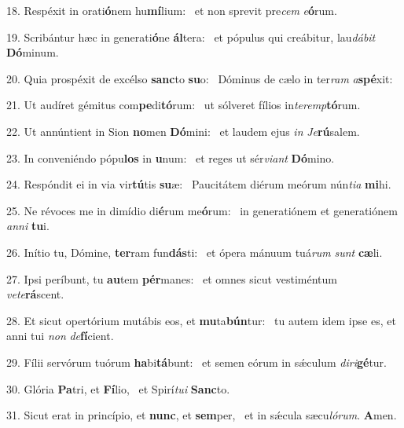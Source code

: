 18. Respéxit in orati\textbf{ó}nem hu\textbf{mí}lium: \ast\  et non sprevit pre\textit{cem} \textit{e}\textbf{ó}rum.\

19. Scribántur hæc in generati\textbf{ó}ne \textbf{ál}tera: \ast\  et pópulus qui creábitur, lau\textit{dá}\textit{bit} \textbf{Dó}minum.\

20. Quia prospéxit de excélso \textbf{sanc}to \textbf{su}o: \ast\  Dóminus de cælo in ter\textit{ram} \textit{a}\textbf{spé}xit:\

21. Ut audíret gémitus com\textbf{pe}di\textbf{tó}rum: \ast\  ut sólveret fílios in\textit{ter}\textit{emp}\textbf{tó}rum.\

22. Ut annúntient in Sion \textbf{no}men \textbf{Dó}mini: \ast\  et laudem ejus \textit{in} \textit{Je}\textbf{rú}salem.\

23. In conveniéndo pópu\textbf{los} in \textbf{u}num: \ast\  et reges ut sér\textit{vi}\textit{ant} \textbf{Dó}mino.\

24. Respóndit ei in via vir\textbf{tú}tis \textbf{su}æ: \ast\  Paucitátem diérum meórum nún\textit{ti}\textit{a} \textbf{mi}hi.\

25. Ne révoces me in dimídio di\textbf{é}rum me\textbf{ó}rum: \ast\  in generatiónem et generatiónem \textit{an}\textit{ni} \textbf{tu}i.\

26. Inítio tu, Dómine, \textbf{ter}ram fun\textbf{dás}ti: \ast\  et ópera mánuum tuá\textit{rum} \textit{sunt} \textbf{cæ}li.\

27. Ipsi períbunt, tu \textbf{au}tem \textbf{pér}manes: \ast\  et omnes sicut vestiméntum \textit{ve}\textit{te}\textbf{rá}scent.\

28. Et sicut opertórium mutábis eos, et \textbf{mu}ta\textbf{bún}tur: \ast\  tu autem idem ipse es, et anni tui \textit{non} \textit{de}\textbf{fí}cient.\

29. Fílii servórum tuórum \textbf{ha}bi\textbf{tá}bunt: \ast\  et semen eórum in sǽculum \textit{di}\textit{ri}\textbf{gé}tur.\

30. Glória \textbf{Pa}tri, et \textbf{Fí}lio, \ast\  et Spirí\textit{tu}\textit{i} \textbf{Sanc}to.\

31. Sicut erat in princípio, et \textbf{nunc}, et \textbf{sem}per, \ast\  et in sǽcula sæcu\textit{ló}\textit{rum}. \textbf{A}men.\

